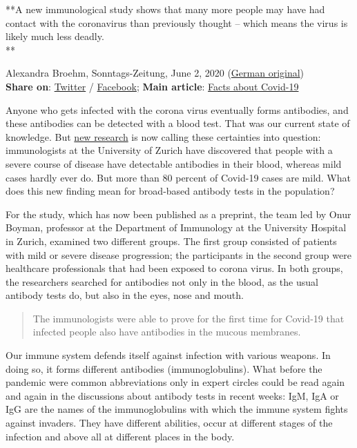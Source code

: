 **A new immunological study shows that many more people may have had
contact with the coronavirus than previously thought -- which means the
virus is likely much less deadly.\\
**

Alexandra Broehm, Sonntags-Zeitung, June 2, 2020
(\href{https://swprs.files.wordpress.com/2020/06/tagesanzeiger-antibody-study-june-2020.pdf}{German
original})\\
\textbf{Share on}:
\href{https://twitter.com/intent/tweet?url=https://swprs.org/coronavirus-antibody-tests-show-only-one-fifth-of-infections/}{Twitter}
/
\href{https://www.facebook.com/share.php?u=https://swprs.org/coronavirus-antibody-tests-show-only-one-fifth-of-infections/}{Facebook};
\textbf{Main article}:
\href{https://swprs.org/a-swiss-doctor-on-covid-19/}{Facts about
Covid-19}

Anyone who gets infected with the corona virus eventually forms
antibodies, and these antibodies can be detected with a blood test. That
was our current state of knowledge. But
\href{https://www.biorxiv.org/content/10.1101/2020.05.21.108308v1}{new
research} is now calling these certainties into question: immunologists
at the University of Zurich have discovered that people with a severe
course of disease have detectable antibodies in their blood, whereas
mild cases hardly ever do. But more than 80 percent of Covid-19 cases
are mild. What does this new finding mean for broad-based antibody tests
in the population?

For the study, which has now been published as a preprint, the team led
by Onur Boyman, professor at the Department of Immunology at the
University Hospital in Zurich, examined two different groups. The first
group consisted of patients with mild or severe disease progression; the
participants in the second group were healthcare professionals that had
been exposed to corona virus. In both groups, the researchers searched
for antibodies not only in the blood, as the usual antibody tests do,
but also in the eyes, nose and mouth.

\begin{quote}
The immunologists were able to prove for the first time for Covid-19
that infected people also have antibodies in the mucous membranes.
\end{quote}

Our immune system defends itself against infection with various weapons.
In doing so, it forms different antibodies (immunoglobulins). What
before the pandemic were common abbreviations only in expert circles
could be read again and again in the discussions about antibody tests in
recent weeks: IgM, IgA or IgG are the names of the immunoglobulins with
which the immune system fights against invaders. They have different
abilities, occur at different stages of the infection and above all at
different places in the body.

